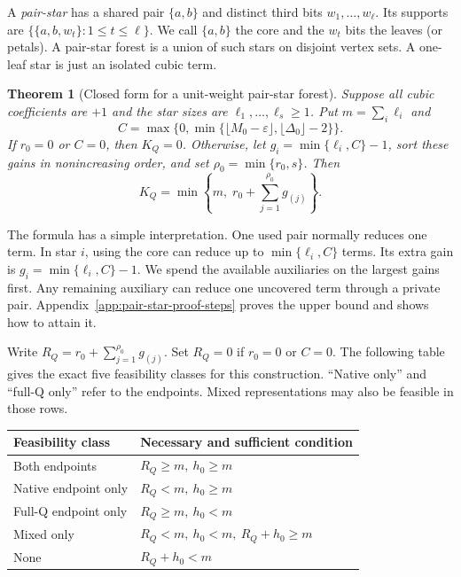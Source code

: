 \documentclass[a4paper,onecolumn,11pt,unpublished]{quantumarticle}
\newtheorem{theorem}[theorem]{Theorem}
\theoremstyle{remark}
\begin{document}
A \emph{pair-star} has a shared pair $\{a,b\}$ and distinct third bits
$w_1,\ldots,w_\ell$. Its supports are
$\{\{a,b,w_t\}:1\leq t\leq\ell\}$.
We call $\{a,b\}$ the core and the $w_t$ bits the leaves (or petals).
A pair-star forest is a union of such stars on disjoint vertex sets.
A one-leaf star is just an isolated cubic term.

\begin{theorem}[Closed form for a unit-weight pair-star forest]
\label{thm:pair-star-capacity}
Suppose all cubic coefficients are $+1$ and the star sizes are
$\ell_1,\ldots,\ell_s\geq1$. Put $m=\sum_i\ell_i$ and
\[
 C=\max\{0,\min\{\lfloor M_0-\varepsilon\rfloor,
                         \lfloor\Delta_0\rfloor-2\}\}.
\]
If $r_0=0$ or $C=0$, then $K_Q=0$. Otherwise, let
$g_i=\min\{\ell_i,C\}-1$, sort these gains in nonincreasing order,
and set $\rho_0=\min\{r_0,s\}$. Then
\begin{equation}
 K_Q=\min\left\{m,\;r_0+\sum_{j=1}^{\rho_0}g_{(j)}\right\}.
 \label{eq:pair-star-capacity}
\end{equation}
\end{theorem}

The formula has a simple interpretation. One used pair normally reduces
one term. In star $i$, using the core can reduce up to $\min\{\ell_i,C\}$
terms. Its extra gain is $g_i=\min\{\ell_i,C\}-1$.
We spend the available auxiliaries on the largest gains first.
Any remaining auxiliary can reduce one uncovered term through a private
pair. Appendix~\ref{app:pair-star-proof-steps} proves the upper bound and
shows how to attain it.

Write $R_Q=r_0+\sum_{j=1}^{\rho_0}g_{(j)}$.
Set $R_Q=0$ if $r_0=0$ or $C=0$.
The following table gives the exact five feasibility classes for this
construction. ``Native only'' and ``full-Q only'' refer to the endpoints.
Mixed representations may also be feasible in those rows.
\begin{center}
\begin{tabular}{ll}
\toprule
Feasibility class & Necessary and sufficient condition\\
\midrule
Both endpoints & $R_Q\geq m,\ h_0\geq m$\\
Native endpoint only & $R_Q<m,\ h_0\geq m$\\
Full-Q endpoint only & $R_Q\geq m,\ h_0<m$\\
Mixed only & $R_Q<m,\ h_0<m,\ R_Q+h_0\geq m$\\
None & $R_Q+h_0<m$\\
\bottomrule
\end{tabular}
\end{center}
\end{document}
